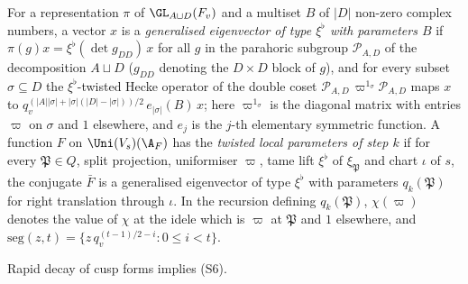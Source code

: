 For a representation $\pi$ of $\GL_{A\sqcup D}(F_v)$ and a multiset $B$ of $|D|$ non-zero complex numbers, a vector $x$ is a
\emph{generalised eigenvector of type $\xi^\flat$ with parameters $B$} if $\pi(g)x=\xi^\flat(\det g_{DD})\,x$ for all $g$ in the parahoric
subgroup $\mathcal P_{A,D}$ of the decomposition $A\sqcup D$ ($g_{DD}$ denoting the $D\times D$ block of $g$), and for every subset
$\sigma\subseteq D$ the $\xi^\flat$-twisted Hecke operator of the double coset $\mathcal P_{A,D}\,\varpi^{1_\sigma}\mathcal P_{A,D}$ maps $x$ to
$q_v^{(|A||\sigma|+|\sigma|(|D|-|\sigma|))/2}\,e_{|\sigma|}(B)\,x$; here $\varpi^{1_\sigma}$ is the diagonal matrix with entries $\varpi$ on
$\sigma$ and $1$ elsewhere, and $e_j$ is the $j$-th elementary symmetric function. A function $F$ on $\Uni(V_s)(\A_F)$ has the \emph{twisted
local parameters of step $k$} if for every $\mathfrak P\in Q$, split projection, uniformiser $\varpi$, tame lift $\xi^\flat$ of
$\xi_{\mathfrak P}$ and chart $\iota$ of $s$, the conjugate $\bar F$ is a generalised eigenvector of type $\xi^\flat$ with parameters
$q_k(\mathfrak P)$ for right translation through $\iota$. In the recursion defining $q_k(\mathfrak P)$, $\chi(\varpi)$ denotes the value of
$\chi$ at the idele which is $\varpi$ at $\mathfrak P$ and $1$ elsewhere, and $\mathrm{seg}(z,t)=\{z\,q_v^{(t-1)/2-i}:0\le i<t\}$.

\begin{lemma}\label{pf:bundles:lem:S6}
Rapid decay of cusp forms implies (S6).
\end{lemma}

